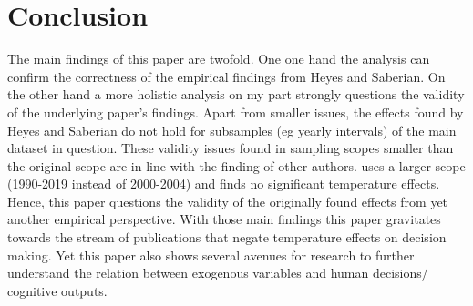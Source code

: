\documentclass[11pt]{article}
\begin{document}
	\section{ Conclusion}
	The main findings of this paper are twofold. One one hand the analysis can confirm the correctness of the empirical findings from Heyes and Saberian. On the other hand a more holistic analysis on my part strongly questions the validity of the underlying paper's findings. Apart from smaller issues, the effects found by Heyes and Saberian do not hold for subsamples (eg yearly intervals) of the main dataset in question. These validity issues found in sampling scopes smaller than the original scope are in line with the finding of other authors. \cite{Spamann.2020} uses a larger scope (1990-2019 instead of 2000-2004) and finds no significant temperature effects. Hence, this paper questions the validity of the originally found effects from yet another empirical perspective.
	With those main findings this paper gravitates towards the stream of publications that negate temperature effects on decision making. Yet this paper also shows several avenues for research to further understand the relation between exogenous variables and human decisions/ cognitive outputs. \newline   
	
	
	
	 
	 
	 
	 
	 
	
	
\end{document}
